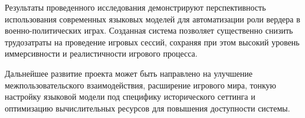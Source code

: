Результаты проведенного исследования демонстрируют перспективность использования современных языковых моделей для автоматизации роли вердера в военно-политических играх. Созданная система позволяет существенно снизить трудозатраты на проведение игровых сессий, сохраняя при этом высокий уровень иммерсивности и реалистичности игрового процесса.

Дальнейшее развитие проекта может быть направлено на улучшение межпользовательского взаимодействия, расширение игрового мира, тонкую настройку языковой модели под специфику исторического сеттинга и оптимизацию вычислительных ресурсов для повышения доступности системы.